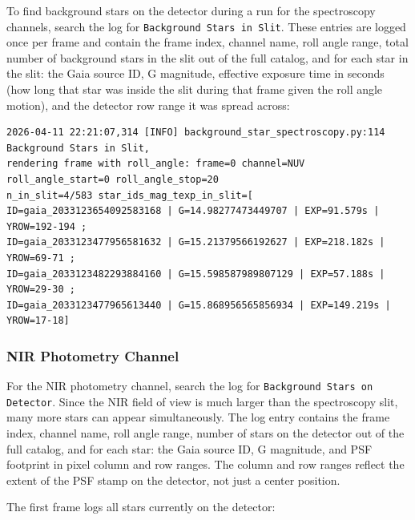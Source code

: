 To find background stars on the detector during a run for the spectroscopy channels, search the log for \texttt{Background Stars in Slit}. These entries are logged once per frame and contain the frame index, channel name, roll angle range, total number of background stars in the slit out of the full catalog, and for each star in the slit: the Gaia source ID, G magnitude, effective exposure time in seconds (how long that star was inside the slit during that frame given the roll angle motion), and the detector row range it was spread across:

\begin{verbatim}
2026-04-11 22:21:07,314 [INFO] background_star_spectroscopy.py:114 Background Stars in Slit, 
rendering frame with roll_angle: frame=0 channel=NUV roll_angle_start=0 roll_angle_stop=20
n_in_slit=4/583 star_ids_mag_texp_in_slit=[
ID=gaia_2033123654092583168 | G=14.98277473449707 | EXP=91.579s | YROW=192-194 ; 
ID=gaia_2033123477956581632 | G=15.21379566192627 | EXP=218.182s | YROW=69-71 ; 
ID=gaia_2033123482293884160 | G=15.598587989807129 | EXP=57.188s | YROW=29-30 ; 
ID=gaia_2033123477965613440 | G=15.868956565856934 | EXP=149.219s | YROW=17-18]
\end{verbatim}

\subsubsection{NIR Photometry Channel}

For the NIR photometry channel, search the log for \texttt{Background Stars on Detector}. Since the NIR field of view is much larger than the spectroscopy slit, many more stars can appear simultaneously. The log entry contains the frame index, channel name, roll angle range, number of stars on the detector out of the full catalog, and for each star: the Gaia source ID, G magnitude, and PSF footprint in pixel column and row ranges. The column and row ranges reflect the extent of the PSF stamp on the detector, not just a center position.

The first frame logs all stars currently on the detector:

